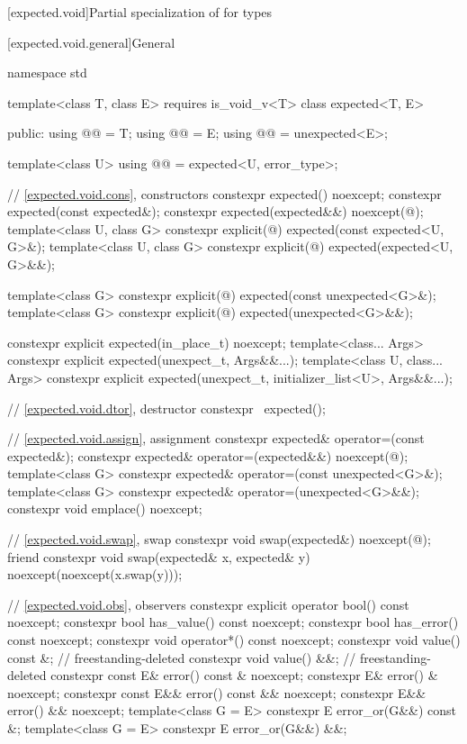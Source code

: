 [expected.void]{Partial specialization of  for  types}

[expected.void.general]{General}

\begin{codeblock}
namespace std {
  template<class T, class E> requires is_void_v<T>
  class expected<T, E> {
  public:
    using @@ = T;
    using @@ = E;
    using @@ = unexpected<E>;

    template<class U>
    using @@ = expected<U, error_type>;

    // \ref{expected.void.cons}, constructors
    constexpr expected() noexcept;
    constexpr expected(const expected&);
    constexpr expected(expected&&) noexcept(@\seebelow@);
    template<class U, class G>
      constexpr explicit(@\seebelow@) expected(const expected<U, G>&);
    template<class U, class G>
      constexpr explicit(@\seebelow@) expected(expected<U, G>&&);

    template<class G>
      constexpr explicit(@\seebelow@) expected(const unexpected<G>&);
    template<class G>
      constexpr explicit(@\seebelow@) expected(unexpected<G>&&);

    constexpr explicit expected(in_place_t) noexcept;
    template<class... Args>
      constexpr explicit expected(unexpect_t, Args&&...);
    template<class U, class... Args>
      constexpr explicit expected(unexpect_t, initializer_list<U>, Args&&...);

    // \ref{expected.void.dtor}, destructor
    constexpr ~expected();

    // \ref{expected.void.assign}, assignment
    constexpr expected& operator=(const expected&);
    constexpr expected& operator=(expected&&) noexcept(@\seebelow@);
    template<class G>
      constexpr expected& operator=(const unexpected<G>&);
    template<class G>
      constexpr expected& operator=(unexpected<G>&&);
    constexpr void emplace() noexcept;

    // \ref{expected.void.swap}, swap
    constexpr void swap(expected&) noexcept(@\seebelow@);
    friend constexpr void swap(expected& x, expected& y) noexcept(noexcept(x.swap(y)));

    // \ref{expected.void.obs}, observers
    constexpr explicit operator bool() const noexcept;
    constexpr bool has_value() const noexcept;
    constexpr bool has_error() const noexcept;
    constexpr void operator*() const noexcept;
    constexpr void value() const &;                                         // freestanding-deleted
    constexpr void value() &&;                                              // freestanding-deleted
    constexpr const E& error() const & noexcept;
    constexpr E& error() & noexcept;
    constexpr const E&& error() const && noexcept;
    constexpr E&& error() && noexcept;
    template<class G = E> constexpr E error_or(G&&) const &;
    template<class G = E> constexpr E error_or(G&&) &&;

}}
\end{codeblock}
